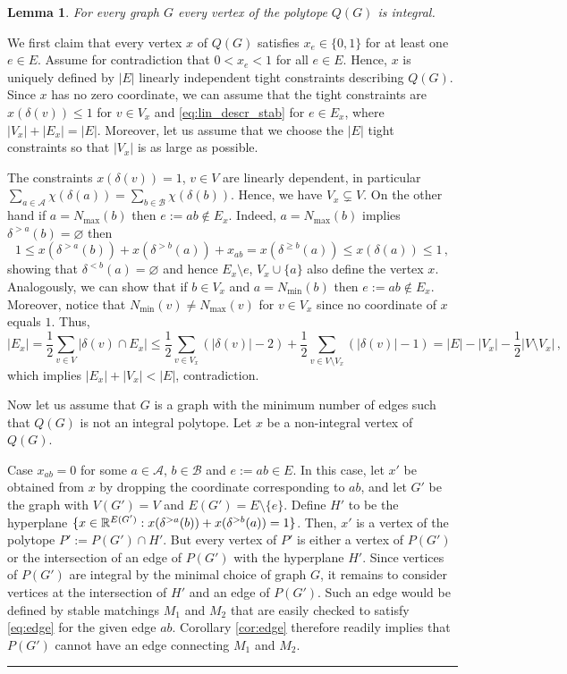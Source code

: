 \documentclass[preprint]{elsarticle}
\newtheorem{lemma}[fact]{Lemma}
\newenvironment{proof}{{\bf Proof:  }}{\hfill\rule{2mm}{2mm}}
\begin{document}
\begin{lemma}
	For every graph $G$ every vertex of the polytope $Q(G)$ is integral.
\end{lemma}
\begin{proof}
  We first claim that every vertex $x$ of $Q(G)$ satisfies $x_e
  \in \{0,1\}$ for at least one $e \in E$. Assume for contradiction
  that $0 < x_e < 1$ for all $e \in E$. Hence, $x$ is uniquely defined 
  by $|E|$ linearly independent tight constraints
  describing $Q(G)$. Since $x$ has no zero coordinate, we can assume
  that the tight constraints are $x(\delta(v))\le 1$ for $v\in V_x$
  and \eqref{eq:lin_descr_stab} for $e\in E_x$, where
  $|V_x|+|E_x|=|E|$. Moreover, let us assume that we choose the $|E|$
  tight constraints so that $|V_x|$ is as large as possible.

The constraints $x(\delta(v))=1$, $v\in V$ are linearly dependent, in particular $\sum_{a\in\mathcal{A}}\chi(\delta(a))=\sum_{b\in\mathcal{B}}\chi(\delta(b))$. Hence, we have $V_x\subsetneq V$. On the other hand if $a=N_{\max}(b)$ then $e:=ab\not\in E_x$. Indeed, $a=N_{\max}(b)$ implies $\delta^{>a}(b)=\varnothing$ then
$$
	1\le x(\delta^{>a}(b))+ x(\delta^{>b}(a)) + x_{ab}=x(\delta^{\ge b}(a)) \le x(\delta(a)) \le 1\,,
$$
showing that $\delta^{< b}(a)=\varnothing$ and hence $E_x\setminus e$, $V_x\cup \{a\}$ also define the vertex $x$. Analogously, we can show that if $b\in V_x$  and $a=N_{\min}(b)$ then $e:=ab\not\in E_x$. Moreover, notice that $N_{\min}(v)\neq N_{\max}(v)$ for $v\in V_x$ since no coordinate of $x$ equals $1$. Thus, 
\[
	|E_x|=\frac{1}{2}\sum_{v\in V} |\delta(v)\cap E_x|\le \frac{1}{2}\sum_{v\in V_x} (|\delta(v)|-2)+\frac{1}{2}\sum_{v\in V\setminus V_x} (|\delta(v)|-1)= |E|-|V_x|-\frac{1}{2}|V\setminus V_x|\,,
\]
which implies $|E_x|+|V_x|< |E|$, contradiction.

\bigskip

Now let us assume that $G$ is a graph with the minimum number of edges such that $Q(G)$ is not an integral polytope. Let $x$ be a non-integral vertex of $Q(G)$.

Case $x_{ab}=0$ for some $a\in \mathcal{A}$, $b\in\mathcal{B}$ and
$e:=ab\in E$. In this case, let $x'$ be obtained from $x$ by dropping
the coordinate corresponding to $ab$, and let $G'$ be the graph with
$V(G')=V$ and $E(G') = E \setminus \{e\}$. Define $H'$ to be the
hyperplane
$\{x\in \mathbb{R}^{E(G')}: x(\delta^{>a}(b))+ x(\delta^{>b}(a))=1\}$. Then,
$x'$ is a vertex of the polytope $P':=P(G')\cap H'$.  But every vertex
of $P'$ is either a vertex of $P(G')$ or the intersection of an edge
of $P(G')$ with the hyperplane $H'$. Since vertices of $P(G')$ are
integral by the minimal choice of graph $G$, it remains to consider
vertices at the intersection of $H'$ and an edge of $P(G')$. Such an
edge would be defined by stable matchings $M_1$ and $M_2$ that are
easily checked to satisfy \eqref{eq:edge} for the given edge $ab$.
Corollary \ref{cor:edge} therefore readily implies that $P(G')$ cannot
have an edge connecting $M_1$ and $M_2$.


\end{proof}
\end{document}

